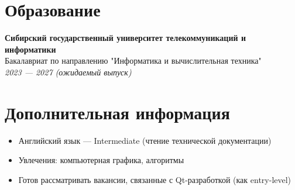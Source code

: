 \documentclass[a4paper,10pt]{article}
\begin{document}
	\section*{Образование}
	\textbf{Сибирский государственный университет телекоммуникаций и информатики} \\
	Бакалавриат по направлению "Информатика и вычислительная техника" \\
	\textit{2023 — 2027 (ожидаемый выпуск)} \\
	
	\section*{Дополнительная информация}
	\begin{itemize}[noitemsep]
		\item Английский язык — Intermediate (чтение технической документации)
		\item Увлечения: компьютерная графика, алгоритмы
		\item Готов рассматривать вакансии, связанные с Qt-разработкой (как entry-level)
	\end{itemize}
\end{document}
